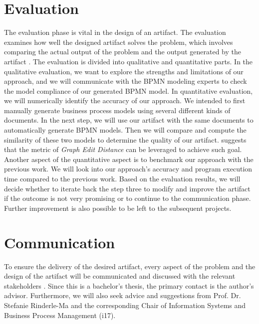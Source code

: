 \section{Evaluation}
The evaluation phase is vital in the design of an artifact. The evaluation examines how well the designed artifact solves the problem, which involves comparing the actual output of the problem and the output generated by the artifact \cite{DSM_3}. The evaluation is divided into qualitative and quantitative parts. In the qualitative evaluation, we want to explore the strengths and limitations of our approach, and we will communicate with the BPMN modeling experts to check the model compliance of our generated BPMN model. In quantitative evaluation, we will numerically identify the accuracy of our approach. We intended to first manually generate business process models using several different kinds of documents. In the next step, we will use our artifact with the same documents to automatically generate BPMN models. Then we will compare and compute the similarity of these two models to determine the quality of our artifact. \cite{t2m_1} suggests that the metric of \textit{Graph Edit Distance} can be leveraged to achieve such goal. Another aspect of the quantitative aspect is to benchmark our approach with the previous work. We will look into our approach's accuracy and program execution time compared to the previous work. Based on the evaluation results, we will decide whether to iterate back the step three to modify and improve the artifact if the outcome is not very promising or to continue to the communication phase. Further improvement is also possible to be left to the subsequent projects.

\section{Communication}
To ensure the delivery of the desired artifact, every aspect of the problem and the design of the artifact will be communicated and discussed with the relevant stakeholders \cite{DSM_3}. Since this is a bachelor's thesis, the primary contact is the author's advisor. Furthermore, we will also seek advice and suggestions from Prof. Dr. Stefanie Rinderle-Ma and the corresponding Chair of Information Systems and Business Process Management (i17). 

